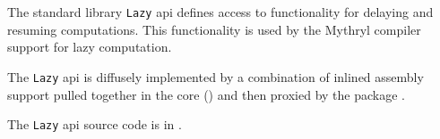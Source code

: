 
The standard library {\tt Lazy} api defines access to functionality for delaying 
and resuming computations.  This functionality is used by the Mythryl compiler support 
for lazy computation.

The {\tt Lazy} api is diffusely implemented by a combination of inlined assembly 
support pulled together in the core 
() and then proxied 
by the package .

The {\tt Lazy} api source code is in .

